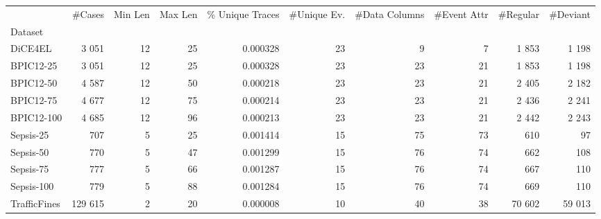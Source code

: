 \begin{tabular}{lrrrrrrrrr}
\toprule
 & \#Cases & Min Len & Max Len & \% Unique Traces & \#Unique Ev. & \#Data Columns & \#Event Attr & \#Regular & \#Deviant \\
Dataset &  &  &  &  &  &  &  &  &  \\
\midrule
DiCE4EL & 3 051 & 12 & 25 & 0.000328 & 23 & 9 & 7 & 1 853 & 1 198 \\
BPIC12-25 & 3 051 & 12 & 25 & 0.000328 & 23 & 23 & 21 & 1 853 & 1 198 \\
BPIC12-50 & 4 587 & 12 & 50 & 0.000218 & 23 & 23 & 21 & 2 405 & 2 182 \\
BPIC12-75 & 4 677 & 12 & 75 & 0.000214 & 23 & 23 & 21 & 2 436 & 2 241 \\
BPIC12-100 & 4 685 & 12 & 96 & 0.000213 & 23 & 23 & 21 & 2 442 & 2 243 \\
Sepsis-25 & 707 & 5 & 25 & 0.001414 & 15 & 75 & 73 & 610 & 97 \\
Sepsis-50 & 770 & 5 & 47 & 0.001299 & 15 & 76 & 74 & 662 & 108 \\
Sepsis-75 & 777 & 5 & 66 & 0.001287 & 15 & 76 & 74 & 667 & 110 \\
Sepsis-100 & 779 & 5 & 88 & 0.001284 & 15 & 76 & 74 & 669 & 110 \\
TrafficFines & 129 615 & 2 & 20 & 0.000008 & 10 & 40 & 38 & 70 602 & 59 013 \\
\bottomrule
\end{tabular}
